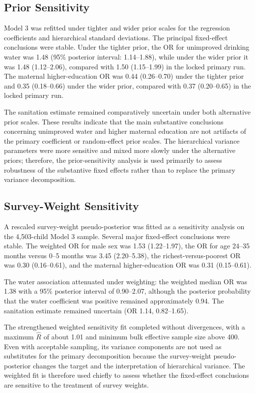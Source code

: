 \subsection{Prior Sensitivity}

Model 3 was refitted under tighter and wider prior scales for the regression coefficients and hierarchical standard deviations. The principal fixed-effect conclusions were stable. Under the tighter prior, the OR for unimproved drinking water was 1.48 (95\% posterior interval: 1.14--1.88), while under the wider prior it was 1.48 (1.12--2.06), compared with 1.50 (1.15--1.99) in the locked primary run. The maternal higher-education OR was 0.44 (0.26--0.70) under the tighter prior and 0.35 (0.18--0.66) under the wider prior, compared with 0.37 (0.20--0.65) in the locked primary run.

The sanitation estimate remained comparatively uncertain under both alternative prior scales. These results indicate that the main substantive conclusions concerning unimproved water and higher maternal education are not artifacts of the primary coefficient or random-effect prior scales. The hierarchical variance parameters were more sensitive and mixed more slowly under the alternative priors; therefore, the prior-sensitivity analysis is used primarily to assess robustness of the substantive fixed effects rather than to replace the primary variance decomposition.

\subsection{Survey-Weight Sensitivity}

A rescaled survey-weight pseudo-posterior was fitted as a sensitivity analysis on the 4,503-child Model 3 sample. Several major fixed-effect conclusions were stable. The weighted OR for male sex was 1.53 (1.22--1.97), the OR for age 24--35 months versus 0--5 months was 3.45 (2.20--5.38), the richest-versus-poorest OR was 0.30 (0.16--0.61), and the maternal higher-education OR was 0.31 (0.15--0.61).

The water association attenuated under weighting: the weighted median OR was 1.38 with a 95\% posterior interval of 0.90--2.07, although the posterior probability that the water coefficient was positive remained approximately 0.94. The sanitation estimate remained uncertain (OR 1.14, 0.82--1.65).

The strengthened weighted sensitivity fit completed without divergences, with a maximum $\hat R$ of about 1.01 and minimum bulk effective sample size above 400. Even with acceptable sampling, its variance components are not used as substitutes for the primary decomposition because the survey-weight pseudo-posterior changes the target and the interpretation of hierarchical variance. The weighted fit is therefore used chiefly to assess whether the fixed-effect conclusions are sensitive to the treatment of survey weights.

